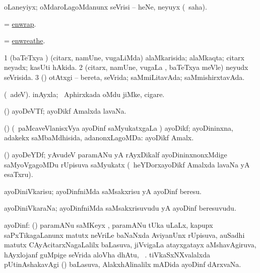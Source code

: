 \bentry
{}
\gl{\sakirx}
\bmng
 oLaneyiyx; oMdaroLagoMdanunx seVrisi -- heNe, neyuyx (\rUpa\ saha). 
\emng
\eentry

\bentry
{}
\gl{\sakirx}
\bmng
= \hyperref{kandict_e.pdf}{E}{enwrap}{enwrap}. 
\emng
\eentry

\bentry
{}
\gl{\sakirx}
\bmng
= \hyperref{kandict_e.pdf}{E}{enwreathe}{enwreathe}. 
\emng
\eentry

\bentry
{}
\gl{\gu}
\bmng
\bnum
\num{1} (baTeTxya \vi) (citarx, namUne, \mo vugaLiMda) alaMkarisida; alaMkaqta; citarx neyadx; kasUti hAkida. 
\num{2} (citarx, namUne, \mo vugaLa \vi, baTeTxya meVle) neyudx seVrisida. 
\num{3} (\rUpa) otAtxgi -- bereta, seVrida; saMmiLitavAda; saMmishirxtavAda. 
\enum
\emng
\eentry

\bentry
{}
\gl{\nA}
\bmng
(\bava\ adeV). inAyxla; \da\ Aphirxkada oMdu jiMke, cigare. 
\emng
\eentry

\bentry
{}
\gl{\saMkiSx}
\bmng
{} 
\emng
\eentry

\bentry
{}
\gl{\nA}
\bmng
(\ravi) ayoDeVTf; ayoDikf Amalxda lavaNa. 
\emng
\eentry

\bentry
{}
\gl{\gu}
\bmng
(\ravi) (\kanmu\ paMcaveVlanisxVya ayoDinf saMyukatxgaLa \vi) ayoDikf; ayoDininxna, adakekx saMbaMdhisida, adanonxLagoMDa:  ayoDikf Amalx. 
\emng
\eentry

\bentry
{}
\gl{\nA}
\bmng
(\ravi) ayoDeYDf; yAvudeV paramANu yA rAyxDikalf ayoDininxnonxMdige saMyoVgagoMDu rUpisuva saMyukatx (\kanmu\ heYDorxayoDikf Amalxda lavaNa yA esaTxru). 
\emng
\eentry

\bentry
{}
\gl{\sakirx}
\bmng
ayoDiniVkarisu; ayoDinfniMda saMsakxrisu yA ayoDinf beresu. 
\emng
\eentry

\bentry
{}
\gl{\nA}
\bmng
ayoDiniVkaraNa; ayoDinfniMda saMsakxrisuvudu yA ayoDinf beresuvudu. 
\emng
\eentry

\bentry
{}
\gl{\nA}
\bmng
ayoDinf: 
\banum
{} (\ravi) paramANu saMKeyx , paramANu tUka  uLaLx, kapupx saPxTikagaLanunx matutx neVriLe baNaNxda AviyanUnx rUpisuva, auSadhi matutx CAyAcitarxNagaLalilx baLasuva, jiVvigaLa atayxgatayx aMshavAgiruva, hAyxlojanf guMpige seVrida aloVha dhAtu, \saMkeV\ . 
 tiVkaSxNXvalalxda pUtinAshakavAgi () baLasuva, AlakxhAlinalilx mADida ayoDinf dArxvaNa. 
\eanum
\emng
\eentry


